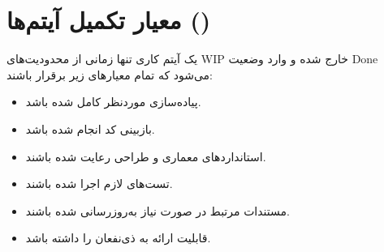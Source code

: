 \section{معیار تکمیل آیتم‌ها ()}


یک آیتم کاری تنها زمانی از محدودیت‌های WIP خارج شده و وارد وضعیت Done می‌شود که تمام معیارهای زیر برقرار باشند:


\begin{itemize}

\item پیاده‌سازی موردنظر کامل شده باشد.

\item بازبینی کد انجام شده باشد.

\item استانداردهای معماری و طراحی رعایت شده باشند.

\item تست‌های لازم اجرا شده باشند.

\item مستندات مرتبط در صورت نیاز به‌روزرسانی شده باشند.

\item قابلیت ارائه به ذی‌نفعان را داشته باشد.

\end{itemize}